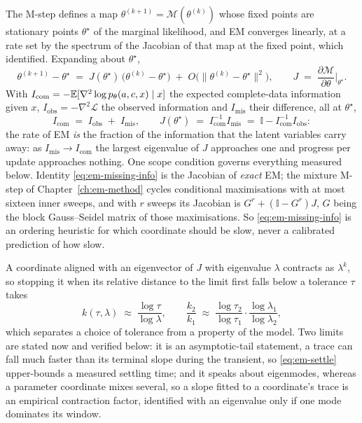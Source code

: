 The M-step defines a map $\theta^{(k+1)} = \mathcal M(\theta^{(k)})$ whose
fixed points are stationary points $\theta^\star$ of the marginal likelihood,
and EM converges linearly, at a rate set by the spectrum of the Jacobian of
that map at the fixed point, which \citet{dempster1977maximum} identified.
Expanding about $\theta^\star$,
\begin{equation}
  \theta^{(k+1)} - \theta^\star
  \;=\; J(\theta^\star)\,\big(\theta^{(k)} - \theta^\star\big)
     \;+\; O\big(\|\theta^{(k)} - \theta^\star\|^2\big),
  \qquad
  J \;=\; \frac{\partial \mathcal M}{\partial \theta}\bigg|_{\theta^\star}.
  \label{eq:em-fixedpoint}
\end{equation}
With
$I_{\mathrm{com}} = -\mathbb{E}[\nabla^2\log p_\theta(a,c,x)\mid x]$ the expected
complete-data information given $x$, $I_{\mathrm{obs}} = -\nabla^2\mathcal L$
the observed information and $I_{\mathrm{mis}}$ their difference, all at
$\theta^\star$,
\begin{equation}
  I_{\mathrm{com}} \;=\; I_{\mathrm{obs}} \;+\; I_{\mathrm{mis}},
  \qquad
  J(\theta^\star)
  \;=\; I_{\mathrm{com}}^{-1} I_{\mathrm{mis}}
  \;=\; \mathbb{I} - I_{\mathrm{com}}^{-1} I_{\mathrm{obs}} :
  \label{eq:em-missing-info}
\end{equation}
the rate of EM \emph{is} the fraction of the information that the latent
variables carry away: as $I_{\mathrm{mis}} \to I_{\mathrm{com}}$ the largest
eigenvalue of $J$ approaches one and progress per update approaches nothing.
One scope condition governs everything measured below. Identity
\eqref{eq:em-missing-info} is the Jacobian of \emph{exact} EM; the mixture
M-step of Chapter~\ref{ch:em-method} cycles conditional maximisations with at
most sixteen inner sweeps, and with $r$ sweeps its Jacobian is
$G^{r} + (\mathbb{I} - G^{r})J$, $G$ being the block Gauss--Seidel matrix of
those maximisations. So \eqref{eq:em-missing-info} is an ordering heuristic
for which coordinate should be slow, never a calibrated prediction of how
slow.

A coordinate aligned with an eigenvector of $J$ with eigenvalue $\lambda$
contracts as $\lambda^k$, so stopping it when its relative distance to the
limit first falls below a tolerance $\tau$ takes
\begin{equation}
  k(\tau, \lambda) \;\approx\; \frac{\log \tau}{\log \lambda},
  \qquad
  \frac{k_2}{k_1}
  \;\approx\;
  \frac{\log \tau_2}{\log \tau_1}
  \cdot
  \frac{\log \lambda_1}{\log \lambda_2} ,
  \label{eq:em-settle}
\end{equation}
which separates a choice of tolerance from a property of the model. Two
limits are stated now and verified below: it is an asymptotic-tail statement,
a trace can fall much faster than its terminal slope during the transient, so
\eqref{eq:em-settle} upper-bounds a measured settling time; and it speaks
about eigenmodes, whereas a parameter coordinate mixes several, so a slope
fitted to a coordinate's trace is an empirical contraction factor, identified
with an eigenvalue only if one mode dominates its window.

